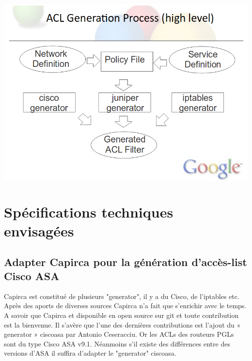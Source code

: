 \documentclass{article}
\begin{document}
\includegraphics[scale=0.4]{capirca.png}

\maketitle
\section{Spécifications techniques envisagées}

\maketitle
\subsection{Adapter Capirca pour la génération d’accès-list Cisco ASA}

Capirca est constitué de plusieurs "generator", il y a du Cisco, de l’iptables etc. Après des aports de diverses sources Capirca n’a fait que s’enrichir avec le temps.  A savoir que Capirca et disponible en open source sur git et toute contribution est la bienvenue. Il s’avère que l’une des dernières contributions est l’ajout du « generator » ciscoasa par Antonio Ceseracciu. Or les ACLs des routeurs PGLs sont du type Cisco ASA v9.1. Néanmoins s'il existe des différences entre des versions d'ASA il suffira d'adapter le "generator" ciscoasa.

\maketitle
\end{document}
